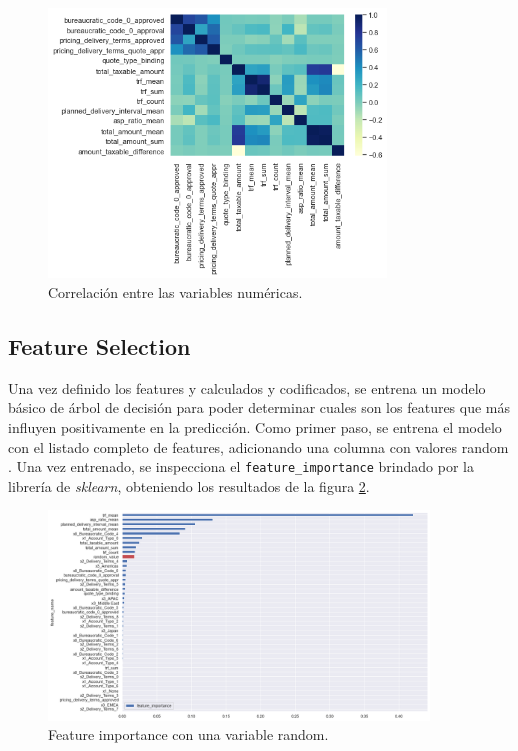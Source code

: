 \documentclass[titlepage,a4paper]{article}
\begin{document}
\begin{figure}[H]
\includegraphics[width=0.8\textwidth]{images/correlation_numeric_values.png}
\cprotect\caption{\label{fig:heatmap_corr} Correlación entre las variables numéricas.}
\end{figure}

\subsection{Feature Selection}\label{sub:feature_selection}

Una vez definido los features y calculados y codificados, se entrena un modelo básico de árbol de decisión para poder determinar cuales son los features que más influyen positivamente en la predicción. Como primer paso, se entrena el modelo con el listado completo de features, adicionando una columna con valores random \cite{intr_machine_learning_with_python}. Una vez entrenado, se inspecciona el \verb|feature_importance| brindado por la librería de \textit{sklearn}, obteniendo los resultados de la figura \ref{fig:features_importance}.


\begin{figure}[H]
\centering
\includegraphics[width=0.9\textwidth]{images/feature_importance_dec_tree.png}
\cprotect\caption{\label{fig:features_importance} Feature importance con una variable random.}
\end{figure}
\end{document}
